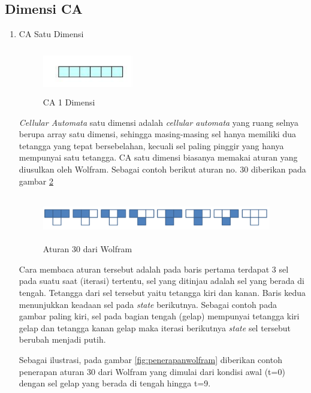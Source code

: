 \subsection{Dimensi CA}
		\begin{enumerate}
			\item CA Satu Dimensi
			
				\begin{figure} [H]
					\centering  
					\includegraphics[width=4cm, height=2cm]{CA1D} 
					\caption[CA 1 Dimensi]{CA 1 Dimensi} 
					\label{fig:CA1D} 
				\end{figure}
			
			\textit{Cellular Automata} satu dimensi adalah \textit{cellular automata} yang ruang selnya berupa array satu dimensi, sehingga masing-masing sel hanya memiliki dua tetangga yang tepat bersebelahan, kecuali sel paling pinggir yang hanya mempunyai satu tetangga. CA satu dimensi biasanya memakai aturan yang diusulkan oleh Wolfram. Sebagai contoh berikut aturan no. 30 diberikan pada gambar \ref{fig:wolfram}
			
			
			\begin{figure} [H]
					\centering  
					\includegraphics[width=10cm, height=2cm]{wolfram} 
					\caption[Aturan 30 dari Wolfram]{Aturan 30 dari Wolfram} 
					\label{fig:wolfram} 
				\end{figure}
				
				Cara membaca aturan tersebut adalah pada baris pertama terdapat 3 sel pada suatu saat (iterasi) tertentu, sel yang ditinjau adalah sel yang berada di tengah. Tetangga dari sel tersebut yaitu tetangga kiri dan kanan. Baris kedua menunjukkan keadaan sel pada \textit{state} berikutnya. Sebagai contoh pada gambar paling kiri, sel pada bagian tengah (gelap) mempunyai tetangga kiri gelap dan tetangga kanan gelap maka iterasi berikutnya \textit{state} sel tersebut berubah menjadi putih.
				
				Sebagai ilustrasi, pada gambar \ref{fig:penerapanwolfram} diberikan contoh penerapan aturan 30 dari Wolfram yang dimulai dari kondisi awal (t=0) dengan sel gelap yang berada di tengah hingga t=9. \cite{ECA}
				

\end{enumerate}

